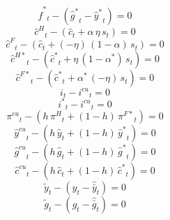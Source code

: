 \begin{dmath}
{{\hat f^*}}_{t}-\left({{\hat g^*}}_{t}-{{\hat y^*}}_{t}\right)=0
\end{dmath}
\begin{dmath}
{{\hat c^H}}_{t}-\left({{\hat c}}_{t}+{{\alpha}}\, {{\eta}}\, {{s}}_{t}\right)=0
\end{dmath}
\begin{dmath}
{{\hat c^F}}_{t}-\left({{\hat c}}_{t}+\left(-{{\eta}}\right)\, \left(1-{{\alpha}}\right)\, {{s}}_{t}\right)=0
\end{dmath}
\begin{dmath}
{{\hat c^{H*}}}_{t}-\left({{\hat c^*}}_{t}+{{\eta}}\, \left(1-{{\alpha^*}}\right)\, {{s}}_{t}\right)=0
\end{dmath}
\begin{dmath}
{{\hat c^{F*}}}_{t}-\left({{\hat c^*}}_{t}+{{\alpha^*}}\, \left(-{{\eta}}\right)\, {{s}}_{t}\right)=0
\end{dmath}
\begin{dmath}
{{i}}_{t}-{{i^{cu}}}_{t}=0
\end{dmath}
\begin{dmath}
{{i^*}}_{t}-{{i^{cu}}}_{t}=0
\end{dmath}
\begin{dmath}
{{\pi^{cu}}}_{t}-\left({{h}}\, {{\pi^H}}_{t}+\left(1-{{h}}\right)\, {{\pi^{F*}}}_{t}\right)=0
\end{dmath}
\begin{dmath}
{{\hat y^{cu}}}_{t}-\left({{h}}\, {{\hat y}}_{t}+\left(1-{{h}}\right)\, {{\hat y^*}}_{t}\right)=0
\end{dmath}
\begin{dmath}
{{\hat g^{cu}}}_{t}-\left({{h}}\, {{\hat g}}_{t}+\left(1-{{h}}\right)\, {{\hat g^*}}_{t}\right)=0
\end{dmath}
\begin{dmath}
{{\hat c^{cu}}}_{t}-\left({{h}}\, {{\hat c}}_{t}+\left(1-{{h}}\right)\, {{\hat c^*}}_{t}\right)=0
\end{dmath}
\begin{dmath}
{{\tilde y}}_{t}-\left({{\hat y}}_{t}-{{\hat {\bar y}}}_{t}\right)=0
\end{dmath}
\begin{dmath}
{{\tilde g}}_{t}-\left({{\hat g}}_{t}-{{\hat {\bar g}}}_{t}\right)=0
\end{dmath}
